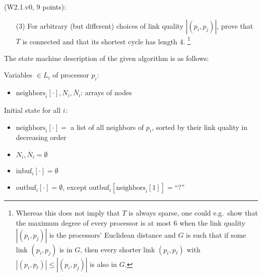 \begin{Exc}{(W2.1.v0, 9 points):}
\begin{enumerate}
\item[(3)] For arbitrary (but different) choices of link quality
$|(p_i,p_j)|$, prove that $T$ is connected and that its shortest
cycle has length 4.
\footnote{Whereas this does not imply that $T$ is always sparse,
one could e.g.\ show that the maximum degree of every processor is at
most 6 when the link quality $|(p_i,p_j)|$ is the processors' Euclidean
distance and $G$ is such that if some link $(p_i,p_j)$ is
in $G$, then every shorter link $(p_i,p_\ell)$ with $|(p_i,p_\ell)|
\leq |(p_i,p_j)|$ is also in $G$.}
\end{enumerate}
\end{Exc}

The state machine description of the given algorithm is as follows:

Variables $\in L_i$ of processor $p_i$:
\begin{itemize}
\item $\text{neighbors}_i[\cdot], N_i, \overline{N}_i$: arrays of nodes
\end{itemize}

Initial state for all $i$:
\begin{itemize}
\item $\text{neighbors}_i[\cdot] = $ a list of all neighbors of $p_i$, sorted by their
      link quality in decreasing order
\item $N_i, \overline{N}_i = \emptyset$
\item $\text{inbuf}_i[\cdot] = \emptyset$
\item $\text{outbuf}_i[\cdot] = \emptyset$, except $\text{outbuf}_i[\text{neighbors}_i[1]] = \text{``?''}$
\end{itemize}

